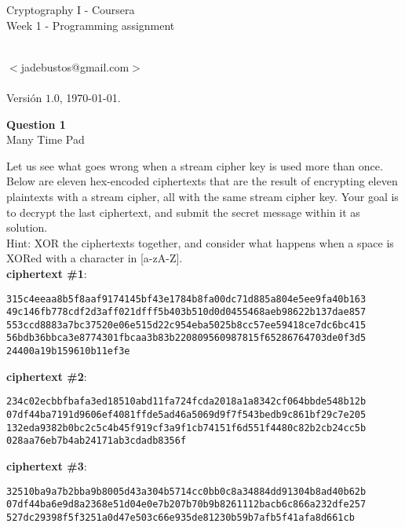 \documentclass[a4paper,12pt]{article}
\author{Jos\'e Angel de Bustos P\'erez}
\begin{document}
\thispagestyle{empty}

\begin{center}
\Huge{Cryptography I - Coursera} \\[.75cm]
\large{Week 1 - Programming assignment}
\end{center}

\large 
\begin{flushright}
\yo \\
$<$jadebustos@gmail.com$>$\\ \ \\ 
Versi\'on $1.0$, \today .\\
\textbf{\LaTeXe}
\end{flushright}

\normalsize

\textbf{Question 1} \\

Many Time Pad 

Let us see what goes wrong when a stream cipher key is used more than once. Below are eleven hex-encoded ciphertexts that are the result of encrypting eleven plaintexts with a stream cipher, all with the same stream cipher key. Your goal is to decrypt the last ciphertext, and submit the secret message within it as solution. \\

Hint: XOR the ciphertexts together, and consider what happens when a space is XORed with a character in [a-zA-Z].\\

\textbf{ciphertext \#1}:
\begin{verbatim}
315c4eeaa8b5f8aaf9174145bf43e1784b8fa00dc71d885a804e5ee9fa40b163
49c146fb778cdf2d3aff021dfff5b403b510d0d0455468aeb98622b137dae857
553ccd8883a7bc37520e06e515d22c954eba5025b8cc57ee59418ce7dc6bc415
56bdb36bbca3e8774301fbcaa3b83b220809560987815f65286764703de0f3d5
24400a19b159610b11ef3e
\end{verbatim}

\textbf{ciphertext \#2}:
\begin{verbatim}
234c02ecbbfbafa3ed18510abd11fa724fcda2018a1a8342cf064bbde548b12b
07df44ba7191d9606ef4081ffde5ad46a5069d9f7f543bedb9c861bf29c7e205
132eda9382b0bc2c5c4b45f919cf3a9f1cb74151f6d551f4480c82b2cb24cc5b
028aa76eb7b4ab24171ab3cdadb8356f
\end{verbatim}

\textbf{ciphertext \#3}:
\begin{verbatim}
32510ba9a7b2bba9b8005d43a304b5714cc0bb0c8a34884dd91304b8ad40b62b
07df44ba6e9d8a2368e51d04e0e7b207b70b9b8261112bacb6c866a232dfe257
527dc29398f5f3251a0d47e503c66e935de81230b59b7afb5f41afa8d661cb
\end{verbatim}
\end{document}
